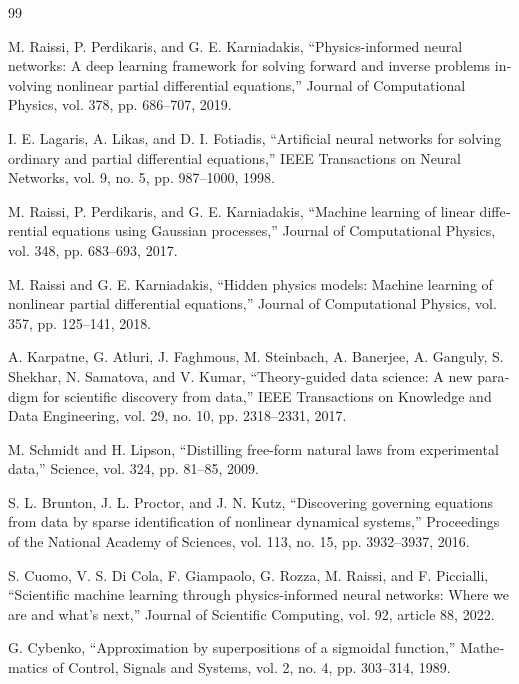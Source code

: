 \begin{singlespace}
\begin{latin}
\begin{thebibliography}{99}
\setlength{\itemsep}{5pt}

M. Raissi, P. Perdikaris, and G. E. Karniadakis, “Physics-informed neural
networks: A deep learning framework for solving forward and inverse problems
involving nonlinear partial differential equations,” Journal of Computational
Physics, vol. 378, pp. 686–707, 2019.

I. E. Lagaris, A. Likas, and D. I. Fotiadis, “Artificial neural networks for
solving ordinary and partial differential equations,” IEEE Transactions on
Neural Networks, vol. 9, no. 5, pp. 987–1000, 1998.

M. Raissi, P. Perdikaris, and G. E. Karniadakis, “Machine learning of linear
differential equations using Gaussian processes,” Journal of Computational
Physics, vol. 348, pp. 683–693, 2017.

M. Raissi and G. E. Karniadakis, “Hidden physics models: Machine learning of
nonlinear partial differential equations,” Journal of Computational Physics,
vol. 357, pp. 125–141, 2018.

A. Karpatne, G. Atluri, J. Faghmous, M. Steinbach, A. Banerjee, A. Ganguly,
S. Shekhar, N. Samatova, and V. Kumar, “Theory-guided data science: A new
paradigm for scientific discovery from data,” IEEE Transactions on Knowledge
and Data Engineering, vol. 29, no. 10, pp. 2318–2331, 2017.

M. Schmidt and H. Lipson, “Distilling free-form natural laws from experimental
data,” Science, vol. 324, pp. 81–85, 2009.

S. L. Brunton, J. L. Proctor, and J. N. Kutz, “Discovering governing equations
from data by sparse identification of nonlinear dynamical systems,” Proceedings
of the National Academy of Sciences, vol. 113, no. 15, pp. 3932–3937, 2016.

S. Cuomo, V. S. Di Cola, F. Giampaolo, G. Rozza, M. Raissi, and F. Piccialli,
“Scientific machine learning through physics-informed neural networks: Where
we are and what’s next,” Journal of Scientific Computing, vol. 92, article 88,
2022.

G. Cybenko, “Approximation by superpositions of a sigmoidal function,”
Mathematics of Control, Signals and Systems, vol. 2, no. 4, pp. 303–314, 1989.


\end{thebibliography}
\end{latin}
\end{singlespace}
